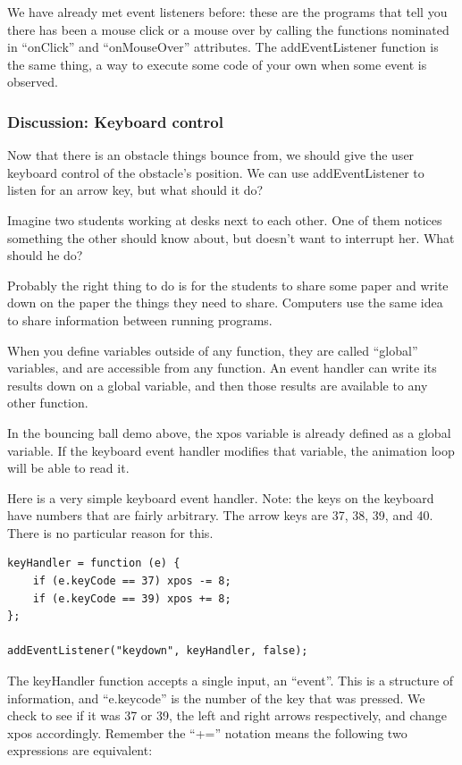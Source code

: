 \documentclass[11pt]{article}
\begin{document}
We have already met event listeners before: these are the programs
that tell you there has been a mouse click or a mouse over by calling
the functions nominated in ``onClick'' and ``onMouseOver''
attributes.  The addEventListener function is the same thing, a way to
execute some code of your own when some event is observed.

\subsubsection{Discussion: Keyboard control}

Now that there is an obstacle things bounce from, we should give the
user keyboard control of the obstacle's position.  We can use
addEventListener to listen for an arrow key, but what should it do?

Imagine two students working at desks next to each other.  One of them
notices something the other should know about, but doesn't want to
interrupt her.  What should he do?

Probably the right thing to do is for the students to share some paper
and write down on the paper the things they need to share.  Computers
use the same idea to share information between running programs.

When you define variables outside of any function, they are called
``global'' variables, and are accessible from any function.  An event
handler can write its results down on a global variable, and then
those results are available to any other function.

In the bouncing ball demo above, the xpos variable is already defined
as a global variable.  If the keyboard event handler modifies that
variable, the animation loop will be able to read it.

Here is a very simple keyboard event handler.  Note: the keys on the
keyboard have numbers that are fairly arbitrary.  The arrow keys are
37, 38, 39, and 40.  There is no particular reason for this.

\begin{verbatim}
keyHandler = function (e) {
    if (e.keyCode == 37) xpos -= 8;
    if (e.keyCode == 39) xpos += 8;
};

addEventListener("keydown", keyHandler, false);
\end{verbatim}

The keyHandler function accepts a single input, an ``event''.  This is
a structure of information, and ``e.keycode'' is the number of the key
that was pressed.  We check to see if it was 37 or 39, the left and
right arrows respectively, and change xpos accordingly.  Remember the
``+='' notation means the following two expressions are equivalent:
\end{document}
